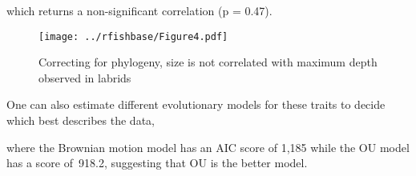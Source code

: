 \begin{Shaded}
\begin{Highlighting}[]
\NormalTok{(pruned$data[[}\NormalTok{]],pruned$phy)}
\NormalTok{(pruned$data[[}\NormalTok{]],pruned$phy)}
\NormalTok{(}\NormalTok{))}
\end{Highlighting}
\end{Shaded}
which returns a non-significant correlation (p = 0.47).

\begin{Shaded}
\begin{Highlighting}[]
\NormalTok{(}
 \NormalTok{() + }\NormalTok{(}\NormalTok{) + }
 \NormalTok{(}\NormalTok{) +}
 \NormalTok{(}\NormalTok{) + }\NormalTok{(}\NormalTok{)}
\end{Highlighting}
\end{Shaded}
\begin{figure}[htbp]
\centering
\texttt{[image: ../rfishbase/Figure4.pdf]}
\caption{Correcting for phylogeny, size is not correlated with maximum
depth observed in labrids}
\end{figure}

One can also estimate different evolutionary models for these traits to
decide which best describes the data,

\begin{Shaded}
\begin{Highlighting}[]
\NormalTok{(pruned$phy, pruned$data[[}\NormalTok{]], }\NormalTok{)[[}\NormalTok{]]}
\NormalTok{(pruned$phy, pruned$data[[}\NormalTok{]], }\NormalTok{)[[}\NormalTok{]]}
\end{Highlighting}
\end{Shaded}
where the Brownian motion model has an AIC score of 1,185 while the OU
model has a score of~918.2, suggesting that OU is the better model.


